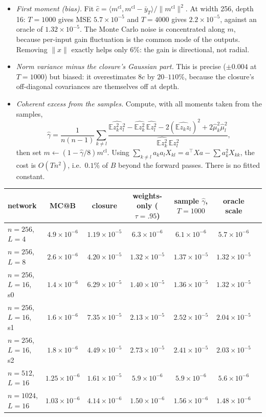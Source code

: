 \documentclass[11pt]{article}
\theoremstyle{definition}
\theoremstyle{remark}
\newcommand{\E}{\mathbb E}
\begin{document}
\begin{itemize}
\item \emph{First moment (bias).} Fit $\hat c=\langle m^{\mathrm{cl}},m^{\mathrm{cl}}-\bar y_T\rangle/\|m^{\mathrm{cl}}\|^2$. At width 256, depth 16: $T=1000$ gives MSE $5.7\times10^{-5}$ and $T=4000$ gives $2.2\times10^{-5}$, against an oracle of $1.32\times10^{-5}$. The Monte Carlo noise is concentrated along $m$, because per-input gain fluctuation is the common mode of the outputs. Removing $\|x\|$ exactly helps only $6\%$: the gain is directional, not radial.
\item \emph{Norm variance minus the closure's Gaussian part.} This is precise ($\pm0.004$ at $T=1000$) but biased: it overestimates $8c$ by $20$--$110\%$, because the closure's off-diagonal covariances are themselves off at depth.
\item \emph{Coherent excess from the samples.} Compute, with all moments taken from the samples,
\[
\hat\gamma=\frac1{n(n-1)}\sum_{k\ne l}\frac{\widehat{\E z_k^2z_l^2}-\widehat{\E z_k^2}\,\widehat{\E z_l^2}-2(\widehat{\E z_kz_l})^2+2\hat\mu_k^2\hat\mu_l^2}{\widehat{\E z_k^2}\,\widehat{\E z_l^2}},
\]
then set $m\leftarrow(1-\hat\gamma/8)m^{\mathrm{cl}}$. Using $\sum_{k\ne l}a_ka_lX_{kl}=a^\top Xa-\sum a_k^2X_{kk}$, the cost is $O(Tn^2)$, i.e.\ $0.1\%$ of $B$ beyond the forward passes. There is no fitted constant.
\end{itemize}

\begin{center}\small
\begin{tabular}{@{}lcccccc@{}}
\toprule
network & MC@B & closure & weights-only ($\tau{=}.95$) & sample $\hat\gamma$, $T{=}1000$ & oracle scale\\
\midrule
$n{=}256$, $L{=}4$ & $4.9\times10^{-6}$ & $1.19\times10^{-5}$ & $6.3\times10^{-6}$ & $6.1\times10^{-6}$ & $5.7\times10^{-6}$\\
$n{=}256$, $L{=}8$ & $2.6\times10^{-6}$ & $4.20\times10^{-5}$ & $1.32\times10^{-5}$ & $1.37\times10^{-5}$ & $1.32\times10^{-5}$\\
$n{=}256$, $L{=}16$, s0 & $1.4\times10^{-6}$ & $6.29\times10^{-5}$ & $1.40\times10^{-5}$ & $1.36\times10^{-5}$ & $1.32\times10^{-5}$\\
$n{=}256$, $L{=}16$, s1 & $1.6\times10^{-6}$ & $7.35\times10^{-5}$ & $2.13\times10^{-5}$ & $2.52\times10^{-5}$ & $2.04\times10^{-5}$\\
$n{=}256$, $L{=}16$, s2 & $1.8\times10^{-6}$ & $4.49\times10^{-5}$ & $2.73\times10^{-5}$ & $2.41\times10^{-5}$ & $2.03\times10^{-5}$\\
$n{=}512$, $L{=}16$ & $1.25\times10^{-6}$ & $1.61\times10^{-5}$ & $5.9\times10^{-6}$ & $5.9\times10^{-6}$ & $5.6\times10^{-6}$\\
$n{=}1024$, $L{=}16$ & $1.03\times10^{-6}$ & $4.14\times10^{-6}$ & $1.50\times10^{-6}$ & $1.56\times10^{-6}$ & $1.48\times10^{-6}$\\
\bottomrule
\end{tabular}
\end{center}
\end{document}
